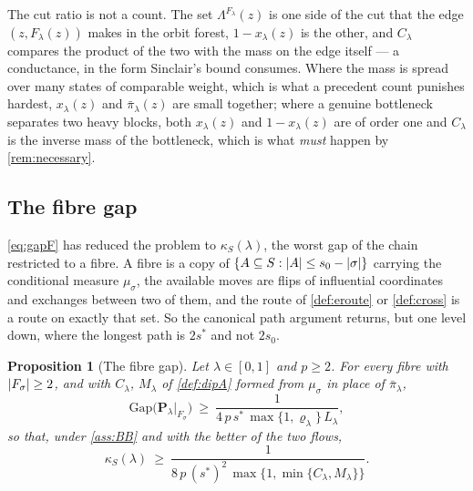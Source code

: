 \documentclass[aos]{imsart}
\DeclarePairedDelimiter{\abs}{\lvert}{\rvert}
\theoremstyle{plain}
\newtheorem{proposition}{Proposition}[section]
\theoremstyle{definition}
\begin{document}
    The cut ratio is not a count. The set $\Lambda^{F_\lambda}(z)$ is one
    side of the cut that the edge $(z,F_\lambda(z))$ makes in the orbit
    forest, $1-x_\lambda(z)$ is the other, and $C_\lambda$ compares the
    product of the two with the mass on the edge itself --- a conductance,
    in the form Sinclair's bound consumes. Where the mass is spread over
    many states of comparable weight, which is what a precedent count
    punishes hardest, $x_\lambda(z)$ and $\bar\pi_\lambda(z)$ are small
    together; where a genuine bottleneck separates two heavy blocks, both
    $x_\lambda(z)$ and $1-x_\lambda(z)$ are of order one and $C_\lambda$ is
    the inverse mass of the bottleneck, which is what \emph{must} happen by
    \cref{rem:necessary}.

    \subsection{The fibre gap}
    \label{sub:fibregap}

    \eqref{eq:gapF} has reduced the problem to $\kappa_S(\lambda)$, the
    worst gap of the chain restricted to a fibre. A fibre is a copy of
    $\{A\subseteq S:\abs A\leq s_0-\abs\sigma\}$ carrying the conditional
    measure $\mu_\sigma$, the available moves are flips of influential
    coordinates and exchanges between two of them, and the route of
    \cref{def:eroute} or \cref{def:cross} is a route on exactly that set.
    So the canonical path argument returns, but one level down, where the
    longest path is $2s^{\ast}$ and not $2s_0$.

    \begin{proposition}[The fibre gap]
        \label{prop:fibre}
        Let $\lambda\in[0,1]$ and $p\geq2$. For every fibre with
        $\abs{F_\sigma}\geq2$, and with $C_\lambda$, $M_\lambda$ of
        \cref{def:dipA} formed from $\mu_\sigma$ in place of
        $\bar\pi_\lambda$,
        \begin{equation}
            \label{eq:fibrebound}
            \mathrm{Gap}\bigl(\mathbf{P}_\lambda|_{F_\sigma}\bigr)
            \ \geq\ \frac{1}{4\,p\,s^{\ast}\,
            \max\{1,\varrho_\lambda\}\,L_\lambda} ,
        \end{equation}
        so that, under \cref{ass:BB} and with the better of the two flows,
        \begin{equation}
            \label{eq:kappapath2}
            \kappa_S(\lambda)\ \geq\
            \frac{1}{8\,p\,(s^{\ast})^{2}\,
            \max\bigl\{1,\min\{C_\lambda,M_\lambda\}\bigr\}} .
        \end{equation}
    \end{proposition}
\end{document}
